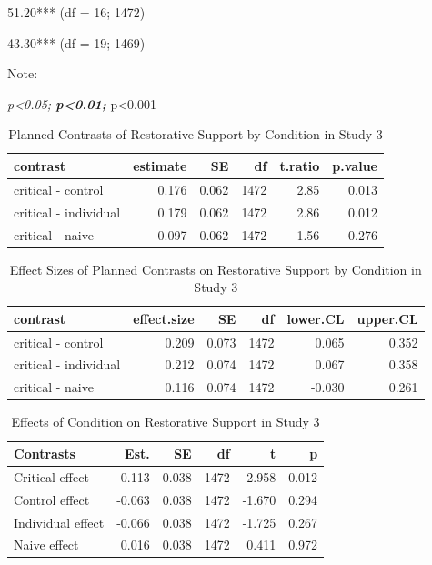 \documentclass[
]{book}
\begin{document}
51.20*** (df = 16; 1472)

43.30*** (df = 19; 1469)

Note:

\emph{p\textless0.05; \textbf{p\textless0.01; }}p\textless0.001

\begin{table}

\caption{\label{tab:rest4-contrast-s3}Planned Contrasts of Restorative Support by Condition in Study 3}
\centering
\fontsize{13}{15}\selectfont
\begin{tabular}[t]{lrrrrr}
\toprule
contrast & estimate & SE & df & t.ratio & p.value\\
\midrule
critical - control & 0.176 & 0.062 & 1472 & 2.85 & 0.013\\
critical - individual & 0.179 & 0.062 & 1472 & 2.86 & 0.012\\
critical - naive & 0.097 & 0.062 & 1472 & 1.56 & 0.276\\
\bottomrule
\end{tabular}
\end{table}

\begin{table}

\caption{\label{tab:rest4-contrast-s3}Effect Sizes of Planned Contrasts on Restorative Support by Condition in Study 3}
\centering
\fontsize{13}{15}\selectfont
\begin{tabular}[t]{lrrrrr}
\toprule
contrast & effect.size & SE & df & lower.CL & upper.CL\\
\midrule
critical - control & 0.209 & 0.073 & 1472 & 0.065 & 0.352\\
critical - individual & 0.212 & 0.074 & 1472 & 0.067 & 0.358\\
critical - naive & 0.116 & 0.074 & 1472 & -0.030 & 0.261\\
\bottomrule
\end{tabular}
\end{table}

\begin{table}

\caption{\label{tab:rest4-contrast-s3}Effects of Condition on Restorative Support in Study 3}
\centering
\begin{tabular}[t]{lrrrrr}
\toprule
Contrasts & Est. & SE & df & t & p\\
\midrule
Critical effect & 0.113 & 0.038 & 1472 & 2.958 & 0.012\\
Control effect & -0.063 & 0.038 & 1472 & -1.670 & 0.294\\
Individual effect & -0.066 & 0.038 & 1472 & -1.725 & 0.267\\
Naive effect & 0.016 & 0.038 & 1472 & 0.411 & 0.972\\
\bottomrule
\end{tabular}
\end{table}
\end{document}

